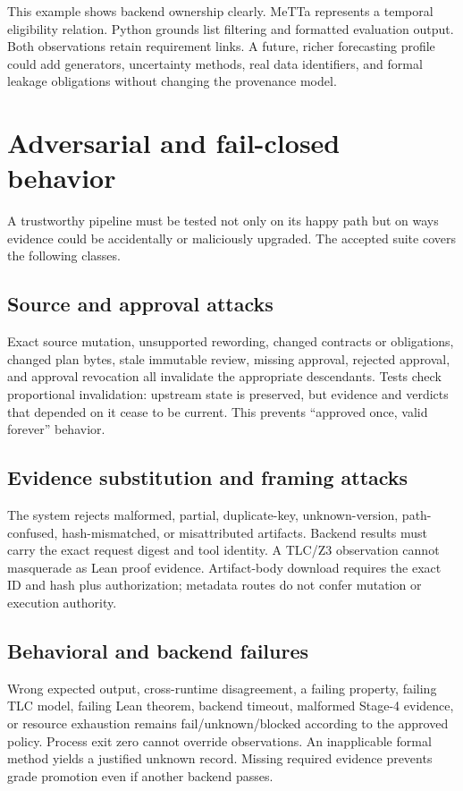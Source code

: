 \documentclass[11pt]{article}
\begin{document}
This example shows backend ownership clearly.  MeTTa represents a temporal
eligibility relation.  Python grounds list filtering and formatted evaluation
output.  Both observations retain requirement links.  A future, richer
forecasting profile could add generators, uncertainty methods, real data
identifiers, and formal leakage obligations without changing the provenance
model.

\section{Adversarial and fail-closed behavior}

A trustworthy pipeline must be tested not only on its happy path but on ways
evidence could be accidentally or maliciously upgraded.  The accepted suite
covers the following classes.

\subsection{Source and approval attacks}

Exact source mutation, unsupported rewording, changed contracts or
obligations, changed plan bytes, stale immutable review, missing approval,
rejected approval, and approval revocation all invalidate the appropriate
descendants.  Tests check proportional invalidation: upstream state is
preserved, but evidence and verdicts that depended on it cease to be current.
This prevents ``approved once, valid forever'' behavior.

\subsection{Evidence substitution and framing attacks}

The system rejects malformed, partial, duplicate-key, unknown-version,
path-confused, hash-mismatched, or misattributed artifacts.  Backend results
must carry the exact request digest and tool identity.  A TLC/Z3 observation
cannot masquerade as Lean proof evidence.  Artifact-body download requires
the exact ID and hash plus authorization; metadata routes do not confer
mutation or execution authority.

\subsection{Behavioral and backend failures}

Wrong expected output, cross-runtime disagreement, a failing property,
failing TLC model, failing Lean theorem, backend timeout, malformed Stage-4
evidence, or resource exhaustion remains fail/unknown/blocked according to the
approved policy.  Process exit zero cannot override observations.  An
inapplicable formal method yields a justified unknown record.  Missing
required evidence prevents grade promotion even if another backend passes.
\end{document}
